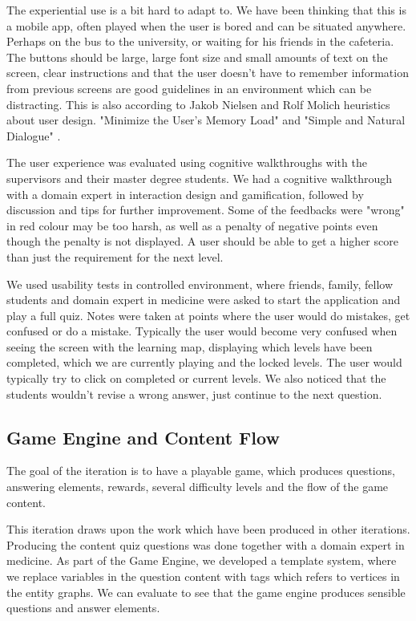 The experiential use is a bit hard to adapt to. We have been thinking that this is a mobile app, often played when the user is bored and can be situated anywhere. Perhaps on the bus to the university, or waiting for his friends in the cafeteria. The buttons should be large, large font size and small amounts of text on the screen, clear instructions and that the user doesn't have to remember information from previous screens are good guidelines in an environment which can be distracting. This is also according to Jakob Nielsen and Rolf Molich heuristics about user design. "Minimize the User’s Memory Load" and  "Simple and Natural Dialogue" \parencite{Molich1990}.

The user experience was evaluated using cognitive walkthroughs with the supervisors and their master degree students. We had a cognitive walkthrough with a domain expert in interaction design and gamification, followed by discussion and tips for further improvement. Some of the feedbacks were "wrong" in red colour may be too harsh, as well as a penalty of negative points even though the penalty is not displayed. A user should be able to get a higher score than just the requirement for the next level.

We used usability tests in controlled environment, where friends, family, fellow students and domain expert in medicine were asked to start the application and play a full quiz. Notes were taken at points where the user would do  mistakes, get confused or do a mistake. Typically the user would become very confused when seeing the screen with the learning map, displaying which levels have been completed, which we are currently playing and the locked levels. The user would typically try to click on completed or current levels. We also noticed that the students wouldn't revise a wrong answer, just continue to the next question.


\subsection{Game Engine and Content Flow}
The goal of the iteration is to have a playable game, which produces questions, answering elements, rewards, several difficulty levels and the flow of the game content.

This iteration draws upon the work which have been produced in other iterations. Producing the content quiz questions was done together with a domain expert in medicine. As part of the Game Engine, we developed a template system, where we replace variables in the question content with tags which refers to vertices in the entity graphs. We can evaluate to see that the game engine produces sensible questions and answer elements.

